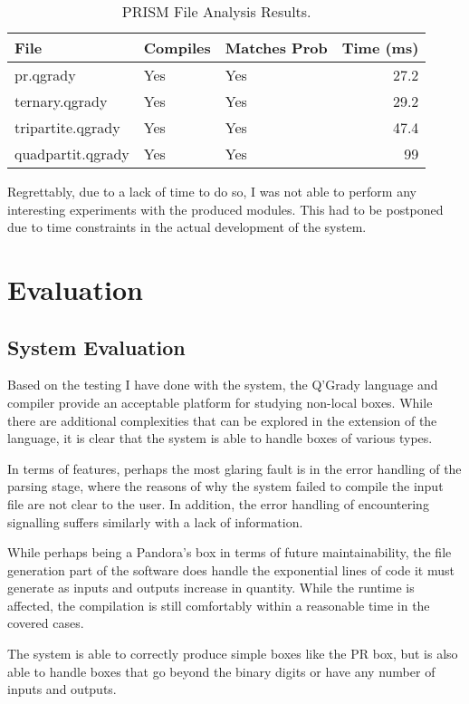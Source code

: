 \documentclass[report.tex]{subfiles}
\begin{document}
\begin{table}[H]
  \centering
  \begin{tabular}{l | l | l | r}
    File & Compiles & Matches Prob & Time (ms)\\
    \hline
    pr.qgrady & Yes & Yes & 27.2 \\
    ternary.qgrady & Yes & Yes & 29.2 \\
    tripartite.qgrady & Yes & Yes & 47.4 \\
    quadpartit.qgrady & Yes & Yes & 99
  \end{tabular}
  \caption{PRISM File Analysis Results.}
  \label{tab:prism_result}
\end{table}

Regrettably, due to a lack of time to do so, I was not able to perform any
interesting experiments with the produced modules. This had to be postponed
due to time constraints in the actual development of the system.

\section{Evaluation} %
\label{sec:evaluation}
\subsection{System Evaluation} %
\label{sub:system_evaluation}
Based on the testing I have done with the system, the Q'Grady language and
compiler provide an acceptable platform for studying non-local boxes. While
there are additional complexities that can be explored in the extension of the
language, it is clear that the system is able to handle boxes of various types.

In terms of features, perhaps the most glaring fault is in the error handling of
the parsing stage, where the reasons of why the system failed to compile the
input file are not clear to the user. In addition, the error handling of
encountering signalling suffers similarly with a lack of information.

While perhaps being a Pandora's box in terms of future maintainability, the file
generation part of the software does handle the exponential lines of code it
must generate as inputs and outputs increase in quantity. While the runtime is
affected, the compilation is still comfortably within a reasonable time in the
covered cases.

The system is able to correctly produce simple boxes like the PR box, but is
also able to handle boxes that go beyond the binary digits or have any number
of inputs and outputs.
\end{document}
